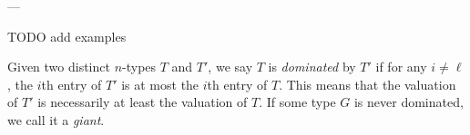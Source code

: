 ---

TODO add examples


Given two distinct $n$-types $T$ and $T'$,
we say $T$ is \emph{dominated} by $T'$ if for any $i \neq \ell$,
the $i$th entry of $T'$ is at most the $i$th entry of $T$.
This means that the valuation of $T'$ is necessarily
at least the valuation of $T$.
If some type $G$ is never dominated, we call it a \emph{giant}.
